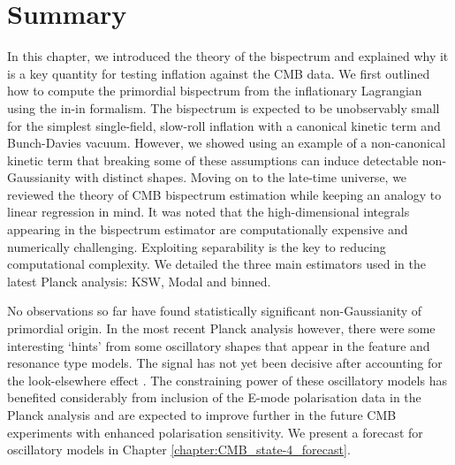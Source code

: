 \newpage
\section*{Summary}

In this chapter, we introduced the theory of the bispectrum and explained why it is a key quantity for testing inflation against the CMB data. We first outlined how to compute the primordial bispectrum from the inflationary Lagrangian using the in-in formalism. The bispectrum is expected to be unobservably small for the simplest single-field, slow-roll inflation with a canonical kinetic term and Bunch-Davies vacuum. However, we showed using an example of a non-canonical kinetic term that breaking some of these assumptions can induce detectable non-Gaussianity with distinct shapes. Moving on to the late-time universe, we reviewed the theory of CMB bispectrum estimation while keeping an analogy to linear regression in mind. It was noted that the high-dimensional integrals appearing in the bispectrum estimator are computationally expensive and numerically challenging. Exploiting separability is the key to reducing computational complexity. We detailed the three main estimators used in the latest Planck analysis: KSW, Modal and binned.

No observations so far have found statistically significant non-Gaussianity of primordial origin. In the most recent Planck analysis however, there were some interesting `hints' from some oscillatory shapes that appear in the feature and resonance type models. The signal has not yet been decisive after accounting for the look-elsewhere effect \cite{Fergusson2015b,PlanckCollaboration2018}. The constraining power of these oscillatory models has benefited considerably from inclusion of the E-mode polarisation data in the Planck analysis and are expected to improve further in the future CMB experiments with enhanced polarisation sensitivity. We present a forecast for oscillatory models in Chapter \ref{chapter:CMB_state-4_forecast}.
